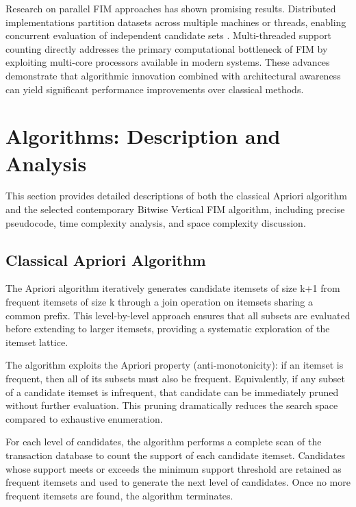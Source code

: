 \documentclass[conference]{IEEEtran}
\begin{document}
Research on parallel FIM approaches has shown promising results. Distributed implementations partition datasets across multiple machines or threads, enabling concurrent evaluation of independent candidate sets \cite{b7}. Multi-threaded support counting directly addresses the primary computational bottleneck of FIM by exploiting multi-core processors available in modern systems. These advances demonstrate that algorithmic innovation combined with architectural awareness can yield significant performance improvements over classical methods.

\section{Algorithms: Description and Analysis}

This section provides detailed descriptions of both the classical Apriori algorithm and the selected contemporary Bitwise Vertical FIM algorithm, including precise pseudocode, time complexity analysis, and space complexity discussion.

\subsection{Classical Apriori Algorithm}

The Apriori algorithm iteratively generates candidate itemsets of size k+1 from frequent itemsets of size k through a join operation on itemsets sharing a common prefix. This level-by-level approach ensures that all subsets are evaluated before extending to larger itemsets, providing a systematic exploration of the itemset lattice.

The algorithm exploits the Apriori property (anti-monotonicity): if an itemset is frequent, then all of its subsets must also be frequent. Equivalently, if any subset of a candidate itemset is infrequent, that candidate can be immediately pruned without further evaluation. This pruning dramatically reduces the search space compared to exhaustive enumeration.

For each level of candidates, the algorithm performs a complete scan of the transaction database to count the support of each candidate itemset. Candidates whose support meets or exceeds the minimum support threshold are retained as frequent itemsets and used to generate the next level of candidates. Once no more frequent itemsets are found, the algorithm terminates.
\end{document}
